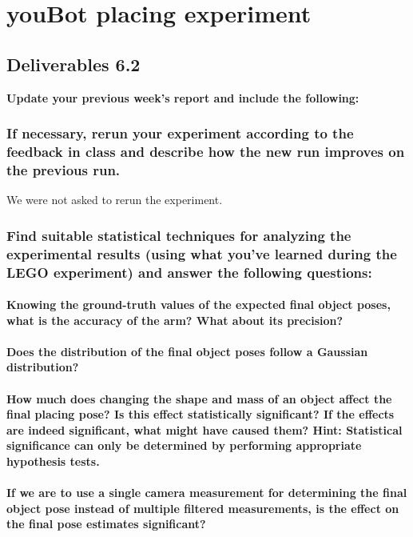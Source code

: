 \chapter{youBot placing experiment}
\section{Deliverables 6.2}
\textbf{Update your previous week’s report and include the following:}

\subsection{If necessary, rerun your experiment according to the feedback in class and describe how the new run improves on the previous run.}
We were not asked to rerun the experiment.

\subsection{Find suitable statistical techniques for analyzing the experimental results (using what you’ve learned during the LEGO experiment) and answer the following questions:}
\subsubsection{Knowing the ground-truth values of the expected final object poses, what is the accuracy of the arm? What about its precision?}

\subsubsection{Does the distribution of the final object poses follow a Gaussian distribution?}

\subsubsection{How much does changing the shape and mass of an object affect the final placing pose? Is this effect statistically significant? If the effects are indeed significant, what might have caused them? Hint: Statistical significance can only be determined by performing appropriate hypothesis tests.}

\subsubsection{If we are to use a single camera measurement for determining the final object pose instead of multiple filtered measurements, is the effect on the final pose estimates significant?}

